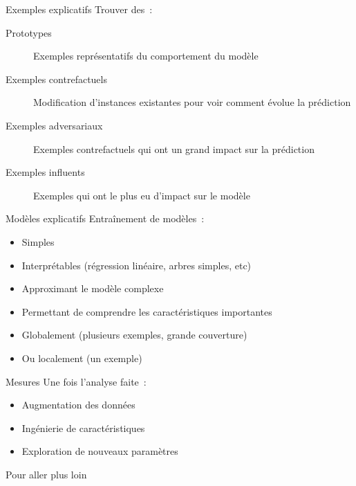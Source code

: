 \begin{frame}{Exemples explicatifs}
  Trouver des~:
  \begin{description}
    \item[Prototypes] Exemples représentatifs du comportement du modèle
    \item[Exemples contrefactuels] Modification d'instances existantes pour voir comment évolue la prédiction
    \item[Exemples adversariaux] Exemples contrefactuels qui ont un grand impact sur la prédiction
    \item[Exemples influents] Exemples qui ont le plus eu d'impact sur le modèle
  \end{description}
\end{frame}

\begin{frame}{Modèles explicatifs}
  Entraînement de modèles~:
  \begin{itemize}
    \item Simples
    \item Interprétables (régression linéaire, arbres simples, etc)
    \item Approximant le modèle complexe
    \item Permettant de comprendre les caractéristiques importantes
    \item Globalement (plusieurs exemples, grande couverture)
    \item Ou localement (un exemple)
  \end{itemize}
\end{frame}

\begin{frame}{Mesures}
  Une fois l'analyse faite~:

  \begin{itemize}
    \item Augmentation des données
    \item Ingénierie de caractéristiques
    \item Exploration de nouveaux paramètres
  \end{itemize}
\end{frame}

\begin{frame}{Pour aller plus loin}
\end{frame}